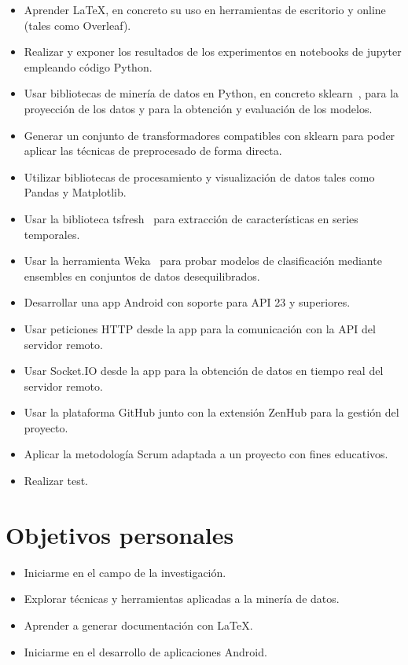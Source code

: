 \begin{itemize}
	\item Aprender \LaTeX{}, en concreto su uso en herramientas de escritorio y online (tales como Overleaf).  
	\item Realizar y exponer los resultados de los experimentos en notebooks de jupyter empleando código Python. 
	\item Usar bibliotecas de minería de datos en Python, en concreto sklearn~\cite{scikit-learn}, para la proyección de los datos y para la obtención y evaluación de los modelos.
	\item Generar un conjunto de transformadores compatibles con sklearn para poder aplicar las técnicas de preprocesado de forma directa.
	\item Utilizar bibliotecas de procesamiento y visualización de datos tales como Pandas y Matplotlib.  
	\item Usar la biblioteca tsfresh~\cite{christ2018time} para extracción de características en series temporales. 
	\item Usar la herramienta Weka~\cite{hall2009weka} para probar modelos de clasificación mediante ensembles en conjuntos de datos desequilibrados. 
	\item Desarrollar una app Android con soporte para API 23 y superiores. 
	\item Usar peticiones HTTP desde la app para la comunicación con la API del servidor remoto. 
	\item Usar Socket.IO desde la app para la obtención de datos en tiempo real del servidor remoto.
	\item Usar la plataforma GitHub junto con la extensión ZenHub para la gestión del proyecto. 
	\item Aplicar la metodología Scrum adaptada a un proyecto con fines educativos. 
	\item Realizar test. 
	
	
\end{itemize}

\section{Objetivos personales}

\begin{itemize}
	\item Iniciarme en el campo de la investigación. 
	\item Explorar técnicas y herramientas aplicadas a la minería de datos. 
	\item Aprender a generar documentación con \LaTeX{}. 
	\item Iniciarme en el desarrollo de aplicaciones Android. 
\end{itemize}
